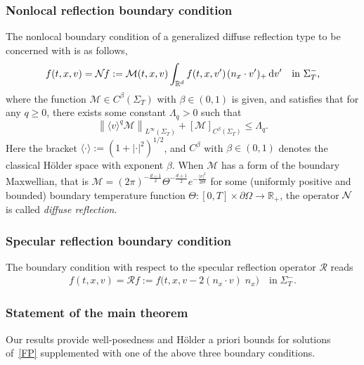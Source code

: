 \documentclass[10pt]{amsart}
\theoremstyle{definition}\newtheorem{defi}[theo]{Definition}\newtheorem{rema}[theo]{Remark}\newtheorem{exam}[theo]{Example}\newtheorem{exem}[theo]{Example}\newtheorem{nota}[theo]{Notation}
\newcommand*{\dif}{\mathop{}\!\mathrm{d}}
\newcommand*\p{\partial}
\newcommand*\R {\mathbb{R}}
\newcommand*\M {{\mathcal{M}}}
\newcommand*\NN {{\mathcal{N}\hspace{-.3mm}}}
\newcommand*\RR {\mathcal{R}}
\newcommand{\la}{\langle}
\newcommand{\ra}{\rangle}
\newcommand{\lv}{\langle v\rangle}
\begin{document}
\subsubsection{Nonlocal reflection boundary condition} 
The nonlocal boundary condition of a generalized diffuse reflection type to be concerned with is as follows,
\begin{align*}
f(t,x,v)=\NN f:=\M(t,x,v)\int_{\R^d}f(t,x,v')\;\!(n_x\cdot v')_+\dif v' {\quad\rm in\ }\Sigma_T^-,
\end{align*}
where the function $\M\in C^\beta(\Sigma_T)$ with $\beta\in(0,1)$ is given, and satisfies that for any $q\ge0$, there exists some constant $\Lambda_q>0$ such that
\begin{equation}\label{M}
\left\|\lv^q\M\right\|_{L^\infty(\Sigma_T)} + [\M]_{C^\beta(\Sigma_T)}\le\Lambda_q.
\end{equation}
Here the bracket $\la\cdot\ra:=(1+|\cdot|^2)^{1/2}$, and $C^\beta$ with $\beta\in(0,1)$ denotes the classical H\"older space with exponent $\beta$. When $\M$ has a form of the boundary Maxwellian, that is $\M=(2\pi)^{-\frac{d-1}{2}} \Theta^{-\frac{d+1}{2}} e^{-\frac{|v|^2}{2\Theta}}$ for some (uniformly positive and bounded) boundary temperature function $\Theta:[0,T]\times\p\Omega\rightarrow\R_+$, the operator $\NN$ is called \emph{diffuse reflection}.

\subsubsection{Specular reflection boundary condition} 

The boundary condition with respect to the specular reflection operator $\RR$ reads
\begin{align*}
f(t,x,v)=\RR f:=f\big(t,x,v-2(n_x\cdot v)\;\!n_x\big) \quad\text{in}\;\Sigma_T^-.
\end{align*}

\subsubsection{Statement of the main theorem} 

Our results provide well-posedness and H\"older a priori bounds for solutions of~\eqref{FP} supplemented with one of the above three boundary conditions.
\end{document}
